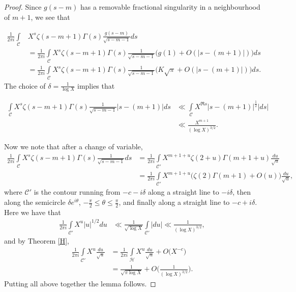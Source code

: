 \documentclass[10pt,a4paper]{amsart}
\begin{document}
\begin{proof}
Since $g(s-m)$ has a removable fractional singularity in a neighbourhood of $m+1$, we see that

\begin{align*}
         \frac{1}{2\pi i} \int\limits_{\mathcal{C}} & X^s\zeta(s-m+1)\Gamma(s) \frac{g(s-m)}{\sqrt{s-m-1}} ds \\
         &=  \frac{1}{2\pi i} \int\limits_{\mathcal{C}} X^s\zeta(s-m+1)\Gamma(s) \frac{1}{\sqrt{s-m-1}}\Big(g(1)+O(|s-(m+1)|)\Big) ds\\
    &=  \frac{1}{2\pi i} \int\limits_{\mathcal{C}} X^s\zeta(s-m+1)\Gamma(s) \frac{1}{\sqrt{s-m-1}}\Big(K\sqrt{\pi}+O(|s-(m+1)|)\Big) ds.
\end{align*}
The choice of $\delta=\frac{1}{\log X}$ implies that 

\begin{align*}
   \int\limits_{\mathcal{C}} X^s\zeta(s-m+1)\Gamma(s) \frac{1}{\sqrt{s-m-1}}|s-(m+1)| ds& \ll \int\limits_{\mathcal{C}} X^{\Re s} |s-(m+1)|^{\frac{1}{2}} |ds|\\
   & \ll \frac{X^{m+1}}{(\log X)^{3/2}}.
\end{align*}

Now we note that after a change of variable,
\begin{align*}
    \frac{1}{2\pi i} \int\limits_{\mathcal{C}} X^s\zeta(s-m+1)\Gamma(s) \frac{1}{\sqrt{s-m-1}} ds &= \frac{1}{2\pi i} \int\limits_{\mathcal{C'}} X^{m+1+u}\zeta(2+u)\Gamma(m+1+u) \frac{du}{\sqrt{u}} \\
    & =  \frac{1}{2\pi i} \int\limits_{\mathcal{C'}} X^{m+1+u}\Big(\zeta(2)\Gamma(m+1)+O(u) \Big) \frac{du}{\sqrt{u}},
\end{align*}
where $\mathcal{C'}$ is the contour running from $-c-i\delta$ along a straight line to $-i\delta$, then along the semicircle $\delta e^{i\theta}$, $-\frac{\pi}{2}\leq \theta \leq \frac{\pi}{2}$, and finally along a straight line to $-c+i\delta$. Here we have that 
\begin{align*}
    \frac{1}{2\pi i} \int\limits_{\mathcal{C'}}X^u|u|^{1/2}du&\ll \frac{1}{\sqrt{\log X}} \int\limits_{\mathcal{C'}} |du| \ll \frac{1}{(\log X)^{3/2}},
\end{align*}
and by Theorem \ref{H},
\begin{align*}
    \frac{1}{2\pi i} \int\limits_{\mathcal{C'}}X^u\frac{du}{\sqrt{u}} &=\frac{1}{2\pi i} \int\limits_{\mathcal{H}}X^u \frac{du}{\sqrt{u}}  +O\Big(X^{-c}\Big)\\
    & = \frac{1}{\sqrt{\pi \log X}} +O\Big(\frac{1}{(\log X)^{3/2}}\Big).
\end{align*}
Putting all above together the lemma follows.


\end{proof}
\end{document}
